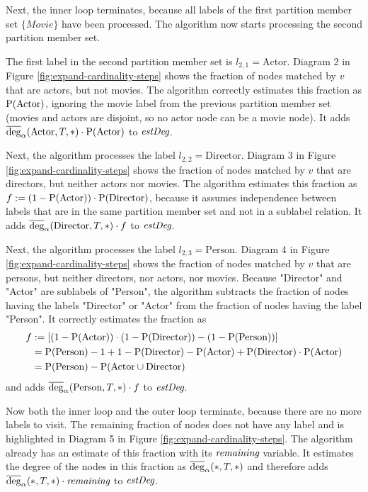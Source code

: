 Next, the inner loop terminates, because all labels of the first
partition member set $\{Movie\}$ have been processed.
The algorithm now starts processing the second partition member set.

The first label in the second partition member set is $l_{2,1} = \text{Actor}$.
Diagram 2 in Figure \ref{fig:expand-cardinality-steps} shows the fraction of
nodes matched by $v$ that are actors, but not movies.
The algorithm correctly estimates this fraction as $\operatorname{P}(\text{Actor})$,
ignoring the movie label from the previous partition member set
(movies and actors are disjoint, so no actor node can be a movie node).
It adds $\avgdeg_\alpha(\text{Actor}, T, *) \cdot \sprob(\text{Actor})$ to
$\textit{estDeg}$.

Next, the algorithm processes the label $l_{2,2} = \text{Director}$.
Diagram 3 in Figure \ref{fig:expand-cardinality-steps} shows the fraction of
nodes matched by $v$ that are directors, but neither actors nor
movies.
The algorithm estimates this fraction as
$f := (1 - \operatorname{P}(\text{Actor})) \cdot \operatorname{P}(\text{Director})$, because it
assumes independence between labels that are in the same partition member set
and not in a sublabel relation.
It adds $\avgdeg_\alpha(\text{Director}, T, *) \cdot f$ to $\textit{estDeg}$.

Next, the algorithm processes the label $l_{2,3} = \text{Person}$.
Diagram 4 in Figure \ref{fig:expand-cardinality-steps} shows the fraction of
nodes matched by $v$ that are persons, but neither directors, nor actors,
nor movies.
Because "Director" and "Actor" are sublabels of "Person", the algorithm
subtracts the fraction of nodes having the labels "Director" or "Actor" from
the fraction of nodes having the label "Person".
It correctly estimates the fraction as
\begin{align*}
  f &:= [(1 - \operatorname{P}(\text{Actor}))
         \cdot (1 - \operatorname{P}(\text{Director})) - (1 - \operatorname{P}(\text{Person}))] \\
    &= \operatorname{P}(\text{Person}) - 1 + 1 - \operatorname{P}(\text{Director}) - \operatorname{P}(\text{Actor})
         + \operatorname{P}(\text{Director}) \cdot \operatorname{P}(\text{Actor}) \\
    &= \operatorname{P}(\text{Person}) - \operatorname{P}(\text{Actor} \cup \text{Director})
\end{align*}
and adds $\avgdeg_\alpha(\text{Person}, T, *) \cdot f$ to
$\textit{estDeg}$.

Now both the inner loop and the outer loop terminate, because there are no
more labels to visit.
The remaining fraction of nodes does not have any label and is highlighted
in Diagram 5 in Figure \ref{fig:expand-cardinality-steps}.
The algorithm already has an estimate of this fraction with its $\textit{remaining}$
variable. It estimates the degree of the nodes in this fraction as
$\avgdeg_\alpha(*, T, *)$ and therefore adds
$\avgdeg_\alpha(*, T, *) \cdot \remaining$ to $\textit{estDeg}$.

